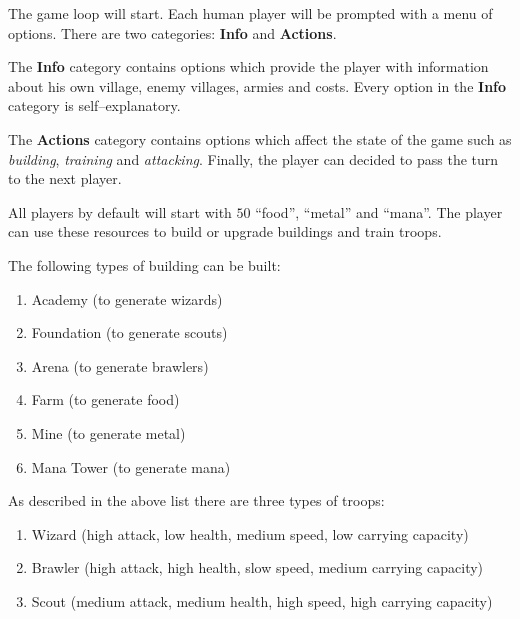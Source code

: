 \documentclass[12pt]{article}
\DeclareRobustCommand{\ul}[1]{%
	\uline{\phantom{#1}}%
	\llap{\contour{white}{#1}}%
}
\begin{document}
The game loop will start. Each human player will be prompted
with a menu of options. There are two categories: \textbf{Info}
and \textbf{Actions}.

The \textbf{Info} category contains options which provide the
player with information about his own village, enemy villages,
armies and costs. Every option in the \textbf{Info} category is
self--explanatory.

The \textbf{Actions} category contains options which affect the
state of the game such as \textit{building}, \textit{training}
and \textit{attacking}. Finally, the player can decided to pass
the turn to the next player.

All players by default will start with $50$ ``food'', ``metal''
and ``mana''. The player can use these resources to build
or upgrade buildings and train troops.

The following types of building can be built:

\begin{enumerate}
    \item Academy (to generate wizards)
    \item Foundation (to generate scouts)
    \item Arena (to generate brawlers)
    \item Farm (to generate food)
    \item Mine (to generate metal)
    \item Mana Tower (to generate mana)
\end{enumerate}

As described in the above list there are three types of troops:

\begin{enumerate}
    \item Wizard (high attack, low health, medium speed, low
        carrying capacity)
    \item Brawler (high attack, high health, slow speed, medium
        carrying capacity)
    \item Scout (medium attack, medium health, high speed, high
        carrying capacity)
\end{enumerate}

\subsubsection*{\ul{Building}}
\end{document}
